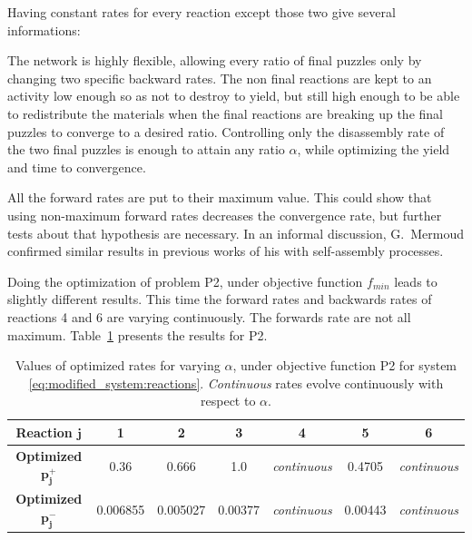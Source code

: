 	Having constant rates for every reaction except those two give several informations:
	
	\begin{my_itemize}
		\item The network is highly flexible, allowing every ratio of final puzzles only by changing two specific backward rates. The non final reactions are kept to an activity low enough so as not to destroy to yield, but still high enough to be able to redistribute the materials when the final reactions are breaking up the final puzzles to converge to a desired ratio. Controlling only the disassembly rate of the two final puzzles is enough to attain any ratio $\alpha$, while optimizing the yield and time to convergence.
		\item All the forward rates are put to their maximum value. This could show that using non-maximum forward rates decreases the convergence rate, but further tests about that hypothesis are necessary. In an informal discussion, G.~Mermoud confirmed similar results in previous works of his with self-assembly processes.
	\end{my_itemize}
	
	Doing the optimization of problem P2, under objective function $f_{min}$ leads to slightly different results. This time the forward rates and backwards rates of reactions 4 and 6 are varying continuously. The forwards rate are not all maximum. Table~\ref{tab:optimized_rates_p2} presents the results for P2.
	
	\begin{table}[h!]
		\begin{center}
		\begin{tabular}{|c|c|c|c|c|c|c|}
			\hline
			\textbf{Reaction} $\mathbf{j}$ & \textbf{1} & \textbf{2} & \textbf{3} & \textbf{4} & \textbf{5} & \textbf{6} \\
			\hline
			\textbf{Optimized} $\mathbf{p^+_j}$ & 0.36 & 0.666 & 1.0 & \textit{continuous} & 0.4705 & \textit{continuous}\\
			\hline
			\textbf{Optimized} $\mathbf{p^-_j}$ & 0.006855 & 0.005027 & 0.00377 & \textit{continuous} &  0.00443 & \textit{continuous} \\
			\hline
		\end{tabular}
		\end{center}
		\caption{Values of optimized rates for varying $\alpha$, under objective function P2 for system \eqref{eq:modified_system:reactions}. \textit{Continuous} rates evolve continuously with respect to $\alpha$.}
		\label{tab:optimized_rates_p2}
	\end{table}
	
